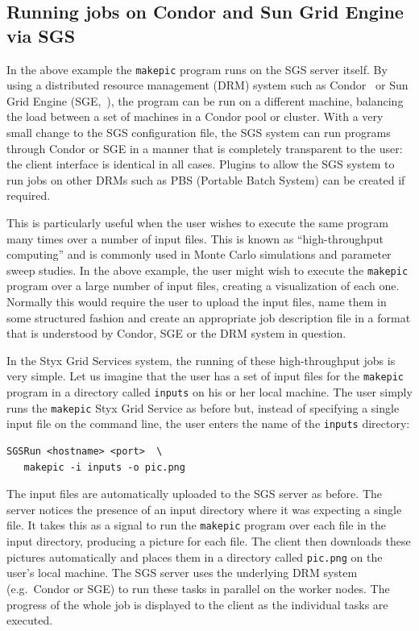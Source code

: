 \documentclass[a4paper]{article}
\begin{document}
\begin{multicols}{2}
\subsection{Running jobs on Condor and Sun Grid Engine via SGS}\label{sec:condor_sge}
In the above example the {\tt makepic} program runs on the SGS server itself.  By using a distributed resource management (DRM) system such as Condor~\cite{condor} or Sun Grid Engine (SGE,~\cite{sungridengine}), the program can be run on a different machine, balancing the load between a set of machines in a Condor pool or cluster.  With a very small change to the SGS configuration file, the SGS system can run programs through Condor or SGE in a manner that is completely transparent to the user: the client interface is identical in all cases.  Plugins to allow the SGS system to run jobs on other DRMs such as PBS (Portable Batch System) can be created if required.

This is particularly useful when the user wishes to execute the same program many times over a number of input files.  This is known as ``high-throughput computing'' and is commonly used in Monte Carlo simulations and parameter sweep studies.  In the above example, the user might wish to execute the {\tt makepic} program over a large number of input files, creating a visualization of each one.  Normally this would require the user to upload the input files, name them in some structured fashion and create an appropriate job description file in a format that is understood by Condor, SGE or the DRM system in question.

In the Styx Grid Services system, the running of these high-throughput jobs is very simple.  Let us imagine that the user has a set of input files for the {\tt makepic} program in a directory called {\tt inputs} on his or her local machine.  The user simply runs the {\tt makepic} Styx Grid Service as before but, instead of specifying a single input file on the command line, the user enters the name of the {\tt inputs} directory:

\begin{verbatim}
SGSRun <hostname> <port>  \
   makepic -i inputs -o pic.png
\end{verbatim}

The input files are automatically uploaded to the SGS server as before.  The server notices the presence of an input directory where it was expecting a single file.  It takes this as a signal to run the {\tt makepic} program over each file in the input directory, producing a picture for each file.  The client then downloads these pictures automatically and places them in a directory called {\tt pic.png} on the user's local machine.  The SGS server uses the underlying DRM system (e.g.\ Condor or SGE) to run these tasks in parallel on the worker nodes.  The progress of the whole job is displayed to the client as the individual tasks are executed.


\end{multicols}
\end{document}
